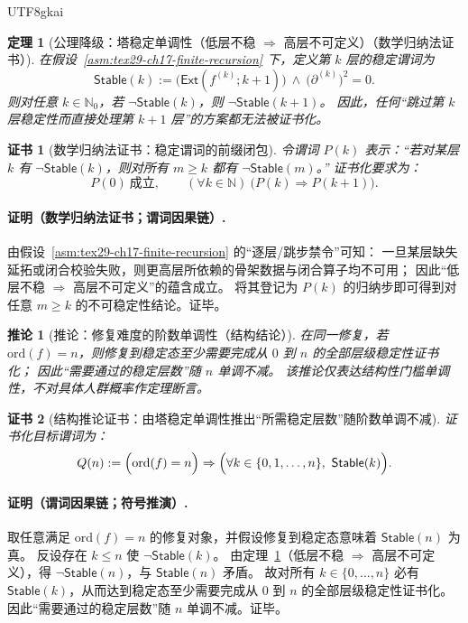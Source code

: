\documentclass[12pt]{article}
\newtheorem{theorem}{定理}[section]
\newtheorem{corollary}{推论}[section]
\newtheorem{Certificate}{证书}[section]
\newcommand{\NN}{\mathbb{N}}
\newcommand{\KouJing}{\texorpdfstring{表述约定}{表述约定}}
\begin{document}
\begin{CJK*}{UTF8}{gkai}
\begin{theorem}[公理降级：塔稳定单调性（低层不稳 $\Rightarrow$ 高层不可定义）（数学归纳法证书）]
\label{thm:tex29-ch17-stability-monotone}
在假设~\ref{asm:tex29-ch17-finite-recursion} 下，定义第 $k$ 层的稳定谓词为
\[
  \mathsf{Stable}(k):=\bigl(\mathsf{Ext}(f^{(k)};k{+}1)\bigr)\ \wedge\ \bigl(\partial^{(k)}\bigr)^2=0.
\]
则对任意 $k\in\NN_0$，若 $\neg\mathsf{Stable}(k)$，则 $\neg\mathsf{Stable}(k{+}1)$。
因此，任何“跳过第 $k$ 层稳定性而直接处理第 $k{+}1$ 层”的方案都无法被证书化。
\end{theorem}

\begin{Certificate}[数学归纳法证书：稳定谓词的前缀闭包]
\label{cert:tex29-ch17-stability-monotone}
令谓词 $P(k)$ 表示：“若对某层 $k$ 有 $\neg\mathsf{Stable}(k)$，则对所有 $m\ge k$ 都有 $\neg\mathsf{Stable}(m)$。”
证书化要求为：
\[
  P(0)\ \text{成立},\qquad (\forall k\in\NN)\ \bigl(P(k)\Rightarrow P(k+1)\bigr).
\]
\end{Certificate}

\paragraph{证明（数学归纳法证书；谓词因果链）.}
由假设~\ref{asm:tex29-ch17-finite-recursion} 的“逐层/跳步禁令”可知：
一旦某层缺失延拓或闭合校验失败，则更高层所依赖的骨架数据与闭合算子均不可用；
因此“低层不稳 $\Rightarrow$ 高层不可定义”的蕴含成立。
将其登记为 $P(k)$ 的归纳步即可得到对任意 $m\ge k$ 的不可稳定性结论。证毕。

\begin{corollary}[推论：修复难度的阶数单调性（结构结论）]
\label{cor:tex29-ch17-difficulty-monotone}
在同一修复，若 $\mathrm{ord}(f)=n$，则修复到稳定态至少需要完成从 $0$ 到 $n$ 的全部层级稳定性证书化；
因此“需要通过的稳定层数”随 $n$ 单调不减。
该推论仅表达结构性门槛单调性，不对具体人群概率作定理断言。
\end{corollary}

\begin{Certificate}[结构推论证书：由塔稳定单调性推出“所需稳定层数”随阶数单调不减]
\label{cert:tex29-ch17-difficulty-monotone}
证书化目标谓词为：
\[
  Q(n):=\Bigl(\mathrm{ord}(f)=n\Bigr)\Rightarrow
  \Bigl(\forall k\in\{0,1,\dots,n\},\ \mathsf{Stable}(k)\Bigr).
\]
\end{Certificate}

\paragraph{证明（谓词因果链；符号推演）.}
取任意满足 $\mathrm{ord}(f)=n$ 的修复对象，并假设修复到稳定态意味着 $\mathsf{Stable}(n)$ 为真。
反设存在 $k\le n$ 使 $\neg\mathsf{Stable}(k)$。
由定理~\ref{thm:tex29-ch17-stability-monotone}（低层不稳 $\Rightarrow$ 高层不可定义），得 $\neg\mathsf{Stable}(n)$，与 $\mathsf{Stable}(n)$
  矛盾。
故对所有 $k\in\{0,\dots,n\}$ 必有 $\mathsf{Stable}(k)$，从而达到稳定态至少需要完成从 $0$ 到 $n$ 的全部层级稳定性证书化。
因此“需要通过的稳定层数”随 $n$ 单调不减。证毕。


\end{CJK*}
\end{document}
